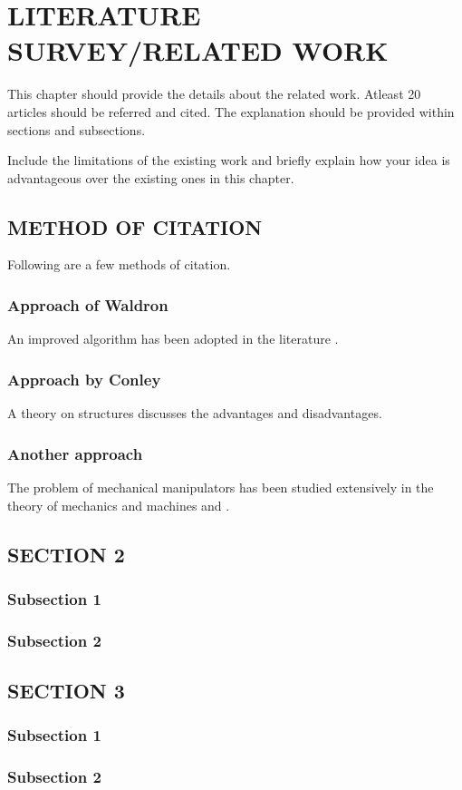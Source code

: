 
\chapter{\uppercase{Literature Survey/Related Work}} %
\label{ch:survey} %

This chapter should provide the details about the related work. Atleast 20 articles should be referred and cited. The explanation should be provided within sections and subsections. 

Include the limitations of the existing work and briefly explain how your idea is advantageous over the existing ones in this chapter.
\section{\uppercase{Method of Citation}}
Following are a few methods of citation.
\subsection{Approach of Waldron}
An improved algorithm has been adopted in the literature \cite{factors}. 

\subsection{Approach by Conley}
A theory \cite{conley} on structures discusses the advantages and disadvantages. 

\subsection{Another approach}
The problem of mechanical manipulators has been studied extensively in the theory of mechanics and machines \cite{holt} and \cite{waldron}.

\section{\uppercase{Section 2}}

\subsection{Subsection 1}

\subsection{Subsection 2}

\section{\uppercase{Section 3}}

\subsection{Subsection 1}

\subsection{Subsection 2}